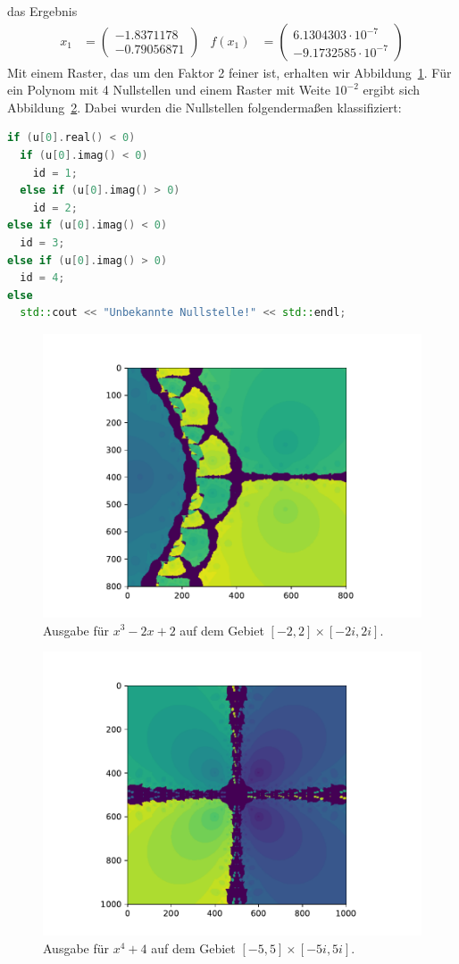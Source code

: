 \documentclass{article}
\theoremstyle{definition}
\begin{document}
das Ergebnis
\begin{align*}
    x_1 &= \begin{pmatrix}
        -1.8371178\\
        -0.79056871
    \end{pmatrix}& f(x_1) &= \begin{pmatrix}
        6.1304303\cdot 10^{-7}\\
        -9.1732585\cdot 10^{-7}
    \end{pmatrix}
\end{align*}
Mit einem Raster, das um den Faktor 2 feiner ist, erhalten wir Abbildung~\ref{3zeros}. Für ein Polynom mit 4 Nullstellen und einem Raster mit Weite $10^{-2}$ ergibt sich Abbildung~\ref{4zeros}.
Dabei wurden die Nullstellen folgendermaßen klassifiziert:
\begin{lstlisting}[language=c++]
if (u[0].real() < 0)
  if (u[0].imag() < 0)
    id = 1;
  else if (u[0].imag() > 0)
    id = 2;
else if (u[0].imag() < 0)
  id = 3;
else if (u[0].imag() > 0)
  id = 4;
else
  std::cout << "Unbekannte Nullstelle!" << std::endl;
\end{lstlisting}
\begin{figure}
    \centering
    \includegraphics[scale=0.9]{out.pdf}
    \caption{Ausgabe für $x^3-2x+2$ auf dem Gebiet $[-2,2]\times[-2i,2i]$.}
    \label{3zeros}
\end{figure}
\begin{figure}
    \centering
    \includegraphics[scale=0.9]{out2.pdf}
    \caption{Ausgabe für $x^4+4$ auf dem Gebiet $[-5,5]\times[-5i,5i]$.}
    \label{4zeros}
\end{figure}
\end{document}
